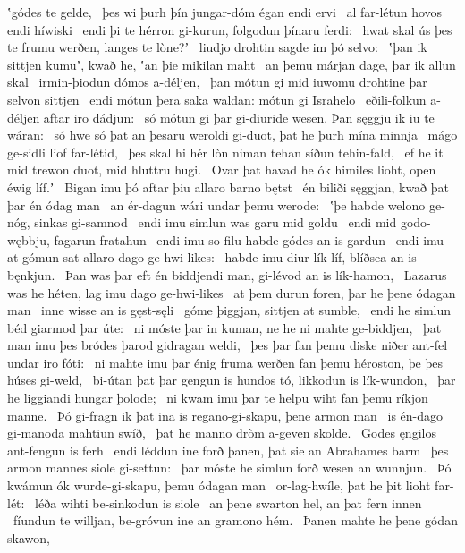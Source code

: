 ʽgódes te gelde, \hld\ þes wi þurh þín jungar-dóm
égan endi ervi \hld\ al far-létun
hovos endi híwiski \hld\ endi þi te hérron gi-kurun,
folgodun þínaru ferdi: \hld\ hwat skal ús þes te frumu werðen,
langes te lòne?ʼ \hld\ liudjo drohtin
sagde im þó selvo: \hld\ ʽþan ik sittjen kumuʼ, kwað he,
ʽan þie mikilan maht \hld\ an þemu márjan dage,
þar ik allun skal \hld\ irmin-þiodun
dómos a-déljen, \hld\ þan mótun gi mid iuwomu drohtine þar
selvon sittjen \hld\ endi mótun þera saka waldan:
mótun gi Israhelo \hld\ eðili-folkun
a-déljen aftar iro dádjun: \hld\ só mótun gi þar gi-diuride wesen.
Þan sęggju ik iu te wáran: \hld\ só hwe só þat an þesaru weroldi gi-duot,
þat he þurh mína minnja \hld\ mágo ge-sidli
liof far-létid, \hld\ þes skal hi hér lòn niman
tehan síðun tehin-fald, \hld\ ef he it mid trewon duot,
mid hluttru hugi. \hld\ Ovar þat havad he ók himiles lioht,
open éwig líf.ʼ \hld\ Bigan imu þó aftar þiu
allaro barno bętst \hld\ én biliði sęggjan,
kwað þat þar én ódag man \hld\ an ér-dagun
wári undar þemu werode: \hld\ ʽþe habde welono ge-nóg,
sinkas gi-samnod \hld\ endi imu simlun was
garu mid goldu \hld\ endi mid godo-wębbju,
fagarun fratahun \hld\ endi imu so filu habde
gódes an is gardun \hld\ endi imu at gómun sat
allaro dago ge-hwi-likes: \hld\ habde imu diur-lík líf,
blíðsea an is bęnkjun. \hld\ Þan was þar eft én biddjendi man,
gi-lévod an is lík-hamon, \hld\ Lazarus was he héten,
lag imu dago ge-hwi-likes \hld\ at þem durun foren,
þar he þene ódagan man \hld\ inne wisse
an is gęst-sęli \hld\ góme þiggjan,
sittjen at sumble, \hld\ endi he simlun béd
giarmod þar úte: \hld\ ni móste þar in kuman,
ne he ni mahte ge-biddjen, \hld\ þat man imu þes bródes þarod
gidragan weldi, \hld\ þes þar fan þemu diske niðer
ant-fel undar iro fóti: \hld\ ni mahte imu þar énig fruma werðen
fan þemu héroston, þe þes húses gi-weld, \hld\ bi-útan þat þar gengun is hundos tó,
likkodun is lík-wundon, \hld\ þar he liggiandi
hungar þolode; \hld\ ni kwam imu þar te helpu wiht
fan þemu ríkjon manne. \hld\ Þó gi-fragn ik þat ina is regano-gi-skapu,
þene armon man \hld\ is én-dago
gi-manoda mahtiun swíð, \hld\ þat he manno dròm
a-geven skolde. \hld\ Godes ęngilos
ant-fengun is ferh \hld\ endi léddun ine forð þanen,
þat sie an Abrahames barm \hld\ þes armon mannes
siole gi-settun: \hld\ þar móste he simlun forð
wesen an wunnjun. \hld\ Þó kwámun ók wurde-gi-skapu,
þemu ódagan man \hld\ or-lag-hwíle,
þat he þit lioht far-lét: \hld\ léða wihti
be-sinkodun is siole \hld\ an þene swarton hel,
an þat fern innen \hld\ fíundun te willjan,
be-gróvun ine an gramono hém. \hld\ Þanen mahte he þene gódan skawon,
